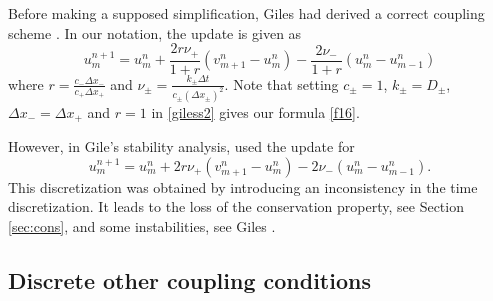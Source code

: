 Before making a supposed simplification, Giles had derived a correct coupling scheme \cite[Eqs.~(15),(16)]{GIL}. 
In our notation, the update is given as
%
\begin{equation}
\label{giless2}
u_{m}^{n+1}= u^n_{m}+\frac{2r\nu_{+}}{1+r}(v^n_{m+1}-u^n_{m})-\frac{2\nu_{-}}{1+r}(u^n_{m}-u^n_{m-1})
\end{equation}
%
where $r=\frac{c_-\Delta x_-}{c_+\Delta x_+}$ and $\nu_{\pm}=\frac{k_{\pm}\Delta t}{c_{\pm}(\Delta x_{\pm})^2}$. 
Note that setting $c_{\pm}=1$, $k_{\pm}=D_{\pm}$, $\Delta x_-=\Delta x_+$ and $r=1$ in \eqref{giless2} gives our formula \eqref{f16}.
 
However, in Gile's stability analysis, \cite[(26)]{GIL} used the update for
% 
\begin{equation}
\label{giless1}
u_{m}^{n+1}= u^n_{m}+2 r\nu_{+}(v^n_{m+1}-u^n_{m})-2\nu_- (u^n_{m}-u^n_{m-1}).
\end{equation}
%
This discretization was obtained by introducing an inconsistency in the time discretization. It leads to the loss of 
the conservation property, see Section \ref{sec:cons}, and some instabilities, see Giles \cite{GIL}.
 

%
%
\subsection{Discrete other coupling conditions}
%
%

